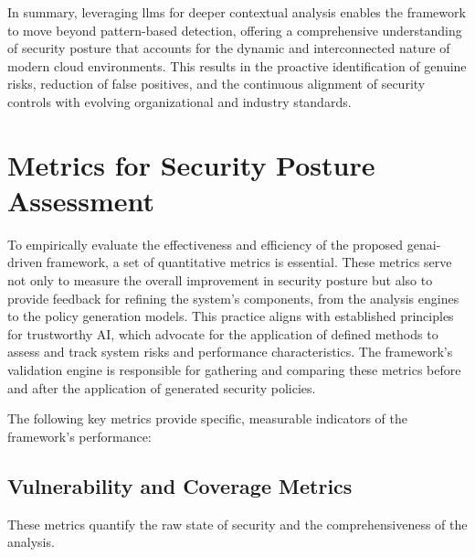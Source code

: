 In summary, leveraging \glspl{llm} for deeper contextual analysis enables the framework to move beyond pattern-based detection, offering a comprehensive understanding of security posture that accounts for the dynamic and interconnected nature of modern cloud environments\cite{li_iris_2025,andrade_enhancing_2025-1}. This results in the proactive identification of genuine risks, reduction of false positives, and the continuous alignment of security controls with evolving organizational and industry standards.


\section{Metrics for Security Posture Assessment} %
\label{sec:Metrics for Security Posture Assessment}

To empirically evaluate the effectiveness and efficiency of the proposed \gls{genai}-driven framework, a set of quantitative metrics is essential. These metrics serve not only to measure the overall improvement in security posture but also to provide feedback for refining the system's components, from the analysis engines to the policy generation models. This practice aligns with established principles for trustworthy AI, which advocate for the application of defined methods to assess and track system risks and performance characteristics. The framework's validation engine is responsible for gathering and comparing these metrics before and after the application of generated security policies.

The following key metrics provide specific, measurable indicators of the framework's performance:

\subsection*{Vulnerability and Coverage Metrics}
These metrics quantify the raw state of security and the comprehensiveness of the analysis.

